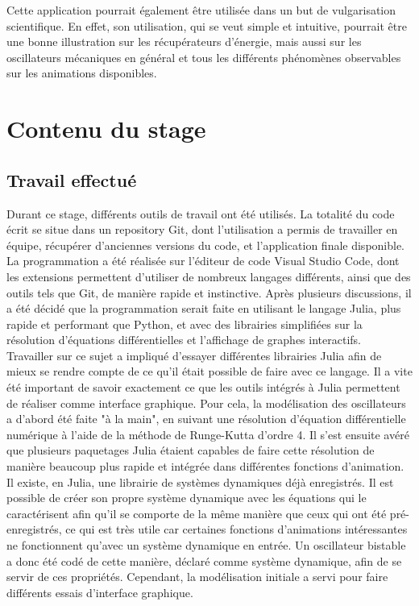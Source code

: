 \documentclass[a4paper, french, 12pt, titlepage]{article}
\begin{document}
Cette application pourrait également être utilisée dans un but de vulgarisation scientifique. En effet, son utilisation, qui se veut simple et intuitive, pourrait être une bonne illustration sur les récupérateurs d'énergie, mais aussi sur les oscillateurs mécaniques en général et tous les différents phénomènes observables sur les animations disponibles. \\



\newpage 

\section{Contenu du stage}


\subsection{Travail effectué}


Durant ce stage, différents outils de travail ont été utilisés. La totalité du code écrit se situe dans un repository Git, dont l'utilisation a permis de travailler en équipe, récupérer d'anciennes versions du code, et l'application finale disponible. La programmation a été réalisée sur l'éditeur de code Visual Studio Code, dont les extensions permettent d'utiliser de nombreux langages différents, ainsi que des outils tels que Git, de manière rapide et instinctive. Après plusieurs discussions, il a été décidé que la programmation serait faite en utilisant le langage Julia, plus rapide et performant que Python, et avec des librairies simplifiées sur la résolution d'équations différentielles et l'affichage de graphes interactifs. \\

Travailler sur ce sujet a impliqué d'essayer différentes librairies Julia afin de mieux se rendre compte de ce qu'il était possible de faire avec ce langage. Il a vite été important de savoir exactement ce que les outils intégrés à Julia permettent de réaliser comme interface graphique. Pour cela, la modélisation des oscillateurs a d'abord été faite "à la main", en suivant une résolution d'équation différentielle numérique à l'aide de la méthode de Runge-Kutta d'ordre 4. Il s'est ensuite avéré que plusieurs paquetages Julia étaient capables de faire cette résolution de manière beaucoup plus rapide et intégrée dans différentes fonctions d'animation. Il existe, en Julia, une librairie de systèmes dynamiques déjà enregistrés. Il est possible de créer son propre système dynamique avec les équations qui le caractérisent afin qu'il se comporte de la même manière que ceux qui ont été pré-enregistrés, ce qui est très utile car certaines fonctions d'animations intéressantes ne fonctionnent qu'avec un système dynamique en entrée. Un oscillateur bistable a donc été codé de cette manière, déclaré comme système dynamique, afin de se servir de ces propriétés. Cependant, la modélisation initiale a servi pour faire différents essais d'interface graphique. \\
\end{document}
